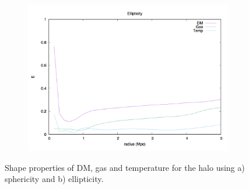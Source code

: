 \documentclass[journal]{IEEEtran}
\begin{document}
\begin{figure}[t]
{\begin{subfigure}[t]{0.37\textwidth}
		\includegraphics[width=\linewidth]{Ellipticity.png}
	\end{subfigure}
}
\caption{Shape properties of DM, gas and temperature for the halo using a) sphericity and b) ellipticity.}
\label{fig:shapes}
\end{figure}
\end{document}
